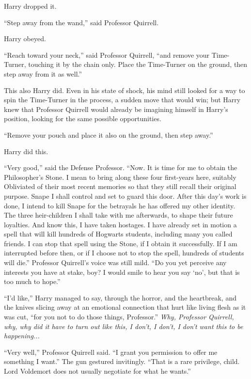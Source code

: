 Harry dropped it.

``Step away from the wand,'' said Professor Quirrell.

Harry obeyed.

``Reach toward your neck,'' said Professor Quirrell, ``and remove your Time-Turner, touching it by the chain only. Place the Time-Turner on the ground, then step away from it as well.''

This also Harry did. Even in his state of shock, his mind still looked for a way to spin the Time-Turner in the process, a sudden move that would win; but Harry knew that Professor Quirrell would already be imagining himself in Harry's position, looking for the same possible opportunities.

``Remove your pouch and place it also on the ground, then step away.''

Harry did this.

``Very good,'' said the Defense Professor. ``Now. It is time for me to obtain the Philosopher's Stone. I mean to bring along these four first-years here, suitably Obliviated of their most recent memories so that they still recall their original purpose. Snape I shall control and set to guard this door. After this day's work is done, I intend to kill Snape for the betrayals he has offered my other identity. The three heir-children I shall take with me afterwards, to shape their future loyalties. And know this, I have taken hostages. I have already set in motion a spell that will kill hundreds of Hogwarts students, including many you called friends. I can stop that spell using the Stone, if I obtain it successfully. If I am interrupted before then, or if I choose not to stop the spell, hundreds of students will die.'' Professor Quirrell's voice was still mild. ``Do you yet perceive any interests you have at stake, boy? I would smile to hear you say `no', but that is too much to hope.''

``I'd like,'' Harry managed to say, through the horror, and the heartbreak, and the knives slicing away at an emotional connection that hurt like living flesh as it was cut, ``for you not to do those things, Professor.'' \emph{Why, Professor Quirrell, why, why did it have to turn out like this, I don't, I don't, I don't want this to be happening...}

``Very well,'' Professor Quirrell said. ``I grant you permission to offer me something I want.'' The gun gestured invitingly. ``That is a rare privilege, child. Lord Voldemort does not usually negotiate for what he wants.''

